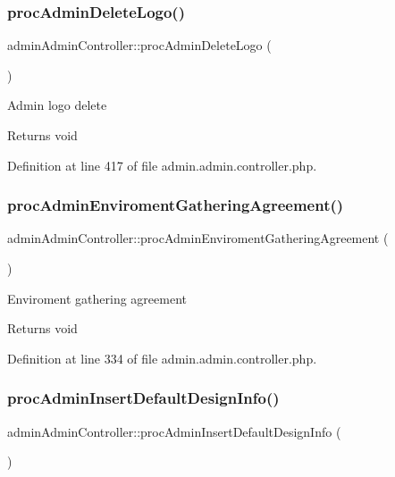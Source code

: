 \subsubsection{\texorpdfstring{proc\+Admin\+Delete\+Logo()}{procAdminDeleteLogo()}}
{\footnotesize\ttfamily admin\+Admin\+Controller\+::proc\+Admin\+Delete\+Logo (\begin{DoxyParamCaption}{ }\end{DoxyParamCaption})}

Admin logo delete \begin{DoxyReturn}{Returns}
void 
\end{DoxyReturn}


Definition at line 417 of file admin.\+admin.\+controller.\+php.

\hypertarget{classadminAdminController_a8ef62179d5114d3d718846179d907bf0}{}\label{classadminAdminController_a8ef62179d5114d3d718846179d907bf0} 
\subsubsection{\texorpdfstring{proc\+Admin\+Enviroment\+Gathering\+Agreement()}{procAdminEnviromentGatheringAgreement()}}
{\footnotesize\ttfamily admin\+Admin\+Controller\+::proc\+Admin\+Enviroment\+Gathering\+Agreement (\begin{DoxyParamCaption}{ }\end{DoxyParamCaption})}

Enviroment gathering agreement \begin{DoxyReturn}{Returns}
void 
\end{DoxyReturn}


Definition at line 334 of file admin.\+admin.\+controller.\+php.

\hypertarget{classadminAdminController_ab0b62d09b5f73640ab9a7a7c5a58e579}{}\label{classadminAdminController_ab0b62d09b5f73640ab9a7a7c5a58e579} 
\subsubsection{\texorpdfstring{proc\+Admin\+Insert\+Default\+Design\+Info()}{procAdminInsertDefaultDesignInfo()}}
{\footnotesize\ttfamily admin\+Admin\+Controller\+::proc\+Admin\+Insert\+Default\+Design\+Info (\begin{DoxyParamCaption}{ }\end{DoxyParamCaption})}



